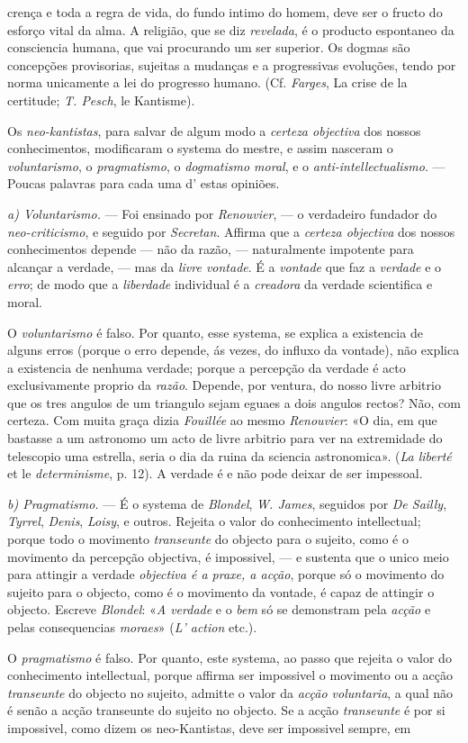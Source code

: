 crença e toda a regra de vida, do fundo intimo do homem, deve ser o fructo do esforço vital da alma. A religião, que se diz \emph{revelada}, é o producto espontaneo da consciencia humana, que vai procurando um ser superior. Os dogmas são concepções provisorias, sujeitas a mudanças e a progressivas evoluções, tendo por norma unicamente a lei do progresso humano. (Cf. \emph{Farges}, La crise de la certitude; \emph{T. Pesch}, le Kantisme).\par Os \emph{neo-kantistas}, para salvar de algum modo a \emph{certeza objectiva} dos nossos conhecimentos, modificaram o systema do mestre, e assim nasceram o \emph{voluntarismo}, o \emph{pragmatismo}, o \emph{dogmatismo moral}, e o \emph{anti-intellectualismo}. --- Poucas palavras para cada uma d' estas opiniões.\par \emph{a) Voluntarismo.} --- Foi ensinado por \emph{Renouvier}, --- o verdadeiro fundador do \emph{neo-criticismo}, e seguido por \emph{Secretan}. Affirma que a \emph{certeza objectiva} dos nossos conhecimentos depende --- não da razão, --- naturalmente impotente para alcançar a verdade, --- mas da \emph{livre vontade}. É a \emph{vontade} que faz a \emph{verdade} e o \emph{erro}; de modo que a \emph{liberdade} individual é a \emph{creadora} da verdade scientifica e moral.\par O \emph{voluntarismo} é falso. Por quanto, esse systema, se explica a existencia de alguns erros (porque o erro depende, ás vezes, do influxo da vontade), não explica a existencia de nenhuma verdade; porque a percepção da verdade é acto exclusivamente proprio da \emph{razão}. Depende, por ventura, do nosso livre arbitrio que os tres angulos de um triangulo sejam eguaes a dois angulos rectos? Não, com certeza. Com muita graça dizia \emph{Fouillée} ao mesmo \emph{Renouvier}: «O dia, em que bastasse a um astronomo um acto de livre arbitrio para ver na extremidade do telescopio uma estrella, seria o dia da ruina da sciencia astronomica». (\emph{La liberté} et le \emph{determinisme}, p. 12). A verdade é e não pode deixar de ser impessoal.\par \emph{b) Pragmatismo.} --- É o systema de \emph{Blondel}, \emph{W. James}, seguidos por \emph{De Sailly}, \emph{Tyrrel}, \emph{Denis}, \emph{Loisy}, e outros. Rejeita o valor do conhecimento intellectual; porque todo o movimento \emph{transeunte} do objecto para o sujeito, como é o movimento da percepção objectiva, é impossivel, --- e sustenta que o unico meio para attingir a verdade \emph{objectiva é a praxe, a acção}, porque só o movimento do sujeito para o objecto, como é o movimento da vontade, é capaz de attingir o objecto. Escreve \emph{Blondel}: «\emph{A verdade} e o \emph{bem} só se demonstram pela \emph{acção} e pelas consequencias \emph{moraes}» (\emph{L' action} etc.).\par O \emph{pragmatismo} é falso. Por quanto, este systema, ao passo que rejeita o valor do conhecimento intellectual, porque affirma ser impossivel o movimento ou a acção \emph{transeunte} do objecto no sujeito, admitte o valor da \emph{acção voluntaria}, a qual não é senão a acção transeunte do sujeito no objecto. Se a acção \emph{transeunte} é por si impossivel, como dizem os neo-Kantistas, deve ser impossivel sempre, em 
